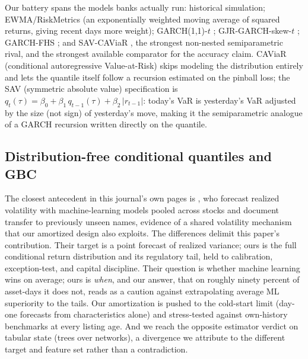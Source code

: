 \documentclass[11pt]{article}
\theoremstyle{remark}
\begin{document}
Our battery spans the models banks actually run: historical simulation;
EWMA/RiskMetrics \citep{zumbach2007} (an exponentially weighted moving
average of squared returns, giving recent days more weight); GARCH(1,1)-$t$
\citep{bollerslev1986}; GJR-GARCH-skew-$t$ \citep[adding leverage and
skewness;][]{glosten1993};
GARCH-FHS \citep[parametric scale, empirical standardized residuals, the volatile-regime best practice;][]{baroneadesi1999fhs}; and SAV-CAViaR
\citep{engle2004caviar}, the strongest non-nested semiparametric
rival, and the strongest available comparator for the accuracy claim.
CAViaR (conditional autoregressive Value-at-Risk) skips modeling the
distribution entirely and lets the quantile itself follow a recursion
estimated on the pinball loss; the SAV (symmetric absolute value)
specification is
$q_t(\tau) = \beta_0 + \beta_1\, q_{t-1}(\tau) + \beta_2\,|r_{t-1}|$: today's VaR is yesterday's VaR adjusted by the size (not sign) of
yesterday's move, making it the semiparametric analogue of a GARCH
recursion written directly on the quantile.

\subsection{Distribution-free conditional quantiles and GBC}

The closest antecedent in this journal's own pages is
\citet{zhang2024commonality}, who forecast realized volatility with
machine-learning models pooled across stocks and document transfer to previously unseen names, evidence of a shared volatility mechanism
that our amortized design also exploits. The differences delimit this
paper's contribution. Their target is a point forecast of realized
variance; ours is the full conditional return distribution and its
regulatory tail, held to calibration, exception-test, and capital
discipline. Their question is whether machine learning wins on average;
ours is \emph{when}, and our answer, that on roughly ninety percent
of asset-days it does not, reads as a caution against extrapolating
average ML superiority to the tails. Our amortization is pushed to the
cold-start limit (day-one forecasts from characteristics alone) and
stress-tested against own-history benchmarks at every listing age. And
we reach the opposite estimator verdict on tabular state (trees over
networks), a divergence we attribute to the different target and feature
set rather than a contradiction.
\end{document}
